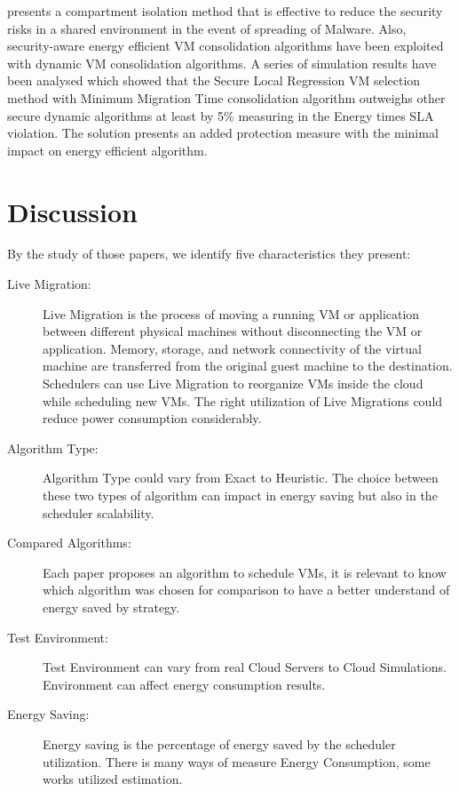 \documentclass{article}
\begin{document}
\cite{Farhad} presents a compartment isolation method  that is effective to reduce the security risks in a shared environment in the event of spreading of Malware. Also, security-aware energy efficient VM consolidation algorithms have been exploited with dynamic VM consolidation algorithms. A series of simulation results have been analysed which showed that the Secure Local Regression VM selection method with Minimum Migration Time consolidation algorithm outweighs other secure dynamic algorithms at least by 5\% measuring in the Energy times SLA violation. The solution presents an added protection measure with the minimal impact on energy efficient algorithm.

\section{Discussion}
By the study of those papers, we identify five characteristics they present:

\begin{description}

    \item[Live Migration:] Live Migration is the process of moving a running VM or application between different physical machines without disconnecting the VM or application. Memory, storage, and network connectivity of the virtual machine are transferred from the original guest machine to the destination. Schedulers can use Live Migration to reorganize VMs inside the cloud while scheduling new VMs. The right  utilization of Live Migrations could reduce power consumption considerably.
    
    \item[Algorithm Type:] Algorithm Type could vary from Exact to Heuristic. The choice between these two types of algorithm can impact in energy saving but also in the scheduler scalability.
    
    \item[Compared Algorithms:] Each paper proposes an algorithm to schedule VMs, it is relevant to know which algorithm was chosen for comparison to have a better understand of energy saved by strategy. 
    
    \item[Test Environment:] Test Environment can vary from real Cloud Servers to Cloud Simulations. Environment can affect energy consumption results.
    
    \item[Energy Saving:] Energy saving is the percentage of energy saved by the scheduler utilization. There is many ways of measure Energy Consumption, some works utilized estimation.

\end{description}
\end{document}
